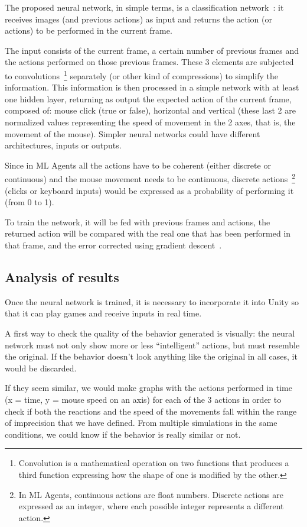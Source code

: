 The proposed neural network, in simple terms, is a classification network~\cite{clasnn}: it receives images (and previous actions) as input and returns the action (or actions) to be performed in the current frame.

The input consists of the current frame, a certain number of previous frames and the actions performed on those previous frames. These 3 elements are subjected to convolutions~\footnote{Convolution is a mathematical operation on two functions that produces a third function expressing how the shape of one is modified by the other.} separately (or other kind of compressions) to simplify the information. This information is then processed in a simple network with at least one hidden layer, returning as output the expected action of the current frame, composed of: mouse click (true or false), horizontal and vertical (these last 2 are normalized values representing the speed of movement in the 2 axes, that is, the movement of the mouse). Simpler neural networks could have different architectures, inputs or outputs.

Since in ML Agents all the actions have to be coherent (either discrete or continuous) and the mouse movement needs to be continuous, discrete actions~\footnote{In ML Agents, continuous actions are float numbers. Discrete actions are expressed as an integer, where each possible integer represents a different action.} (clicks or keyboard inputs) would be expressed as a probability of performing it (from 0 to 1).

To train the network, it will be fed with previous frames and actions, the returned action will be compared with the real one that has been performed in that frame, and the error corrected using gradient descent~\cite{mlagents}.


\subsection{Analysis of results}

Once the neural network is trained, it is necessary to incorporate it into Unity so that it can play games and receive inputs in real time.

A first way to check the quality of the behavior generated is visually: the neural network must not only show more or less “intelligent” actions, but must resemble the original. If the behavior doesn’t look anything like the original in all cases, it would be discarded.

If they seem similar, we would make graphs with the actions performed in time (x = time, y = mouse speed on an axis) for each of the 3 actions in order to check if both the reactions and the speed of the movements fall within the range of imprecision that we have defined. From multiple simulations in the same conditions, we could know if the behavior is really similar or not.

